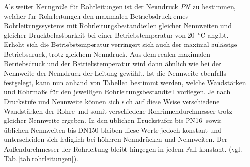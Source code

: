 Als weiter Kenngröße für Rohrleitungen ist der Nenndruck $PN$ zu bestimmen, welcher für Rohrleitungen den maximalen Betriebsdruck eines Rohrleitungssystems mit Rohrleitungsbestandteilen gleicher Nennweiten und gleicher Druckbelastbarkeit bei einer Betriebstemperatur von \SI{20}{\celsius} angibt. Erhöht sich die Betriebstemperatur verringert sich auch der maximal zulässige Betriebsdruck, trotz gleichem Nenndruck.\linebreak
Aus dem realen maximalen Betriebsdruck und der Betriebstemperatur wird dann ähnlich wie bei der Nennweite der Nenndruck der Leitung gewählt. Ist die Nennweite ebenfalls festgelegt, kann nun anhand von Tabellen bestimmt werden, welche Wandstärken und Rohrmaße für den jeweiligen Rohrleitungsbestandteil vorliegen. Je nach Druckstufe und Nennweite können sich sich auf diese Weise verschiedene Wandstärken der Rohre und somit verschiedene Rohrinnendurchmesser trotz gleicher Nennweite ergeben. In den üblichen Druckstufen bis PN16, sowie üblichen Nennweiten bis DN150 bleiben diese Werte jedoch konstant und unterscheiden sich lediglich bei höheren Nenndrücken und Nennweiten. Der Außendurchmesser der Rohrleitung bleibt hingegen in jedem Fall konstant. (vgl.\,Tab.\,\ref{tab:rohrleitungen}). \cite{Ignatowitz.2015}
\vspace*{-2.5mm}

